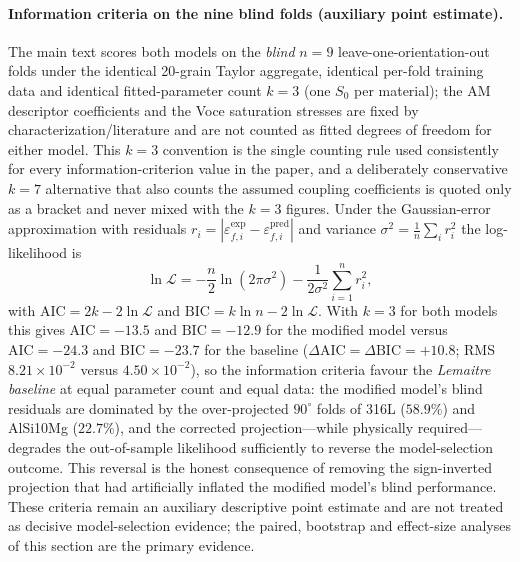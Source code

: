 \documentclass[11pt,a4paper,twocolumn]{article}
\providecommand{\ang}[1]{\ensuremath{#1^{\circ}}}
\begin{document}
\paragraph{Information criteria on the nine blind folds (auxiliary point estimate).}
The main text scores both models on the \emph{blind} $n = 9$ leave-one-orientation-out folds under the identical
20-grain Taylor aggregate, identical per-fold training data and identical fitted-parameter count $k = 3$ (one $S_0$
per material); the AM descriptor coefficients and the Voce saturation stresses are fixed by characterization/literature
and are not counted as fitted degrees of freedom for either model. This $k = 3$ convention is the single counting rule
used consistently for every information-criterion value in the paper, and a deliberately conservative $k = 7$
alternative that also counts the assumed coupling coefficients is quoted only as a bracket and never mixed with the
$k = 3$ figures. Under the Gaussian-error approximation with residuals $r_i = |\varepsilon_{f,i}^{\mathrm{exp}} -
\varepsilon_{f,i}^{\mathrm{pred}}|$ and variance $\sigma^2 = \frac{1}{n}\sum_i r_i^2$ the log-likelihood is
\begin{equation}
\ln \mathcal{L} = -\frac{n}{2}\ln(2\pi\sigma^2) - \frac{1}{2\sigma^2}\sum_{i=1}^{n} r_i^2,
\label{eq:si_loglike}
\end{equation}
with $\mathrm{AIC} = 2k - 2\ln\mathcal{L}$ and $\mathrm{BIC} = k\ln n - 2\ln\mathcal{L}$. With $k = 3$ for both models
this gives $\mathrm{AIC} = -13.5$ and $\mathrm{BIC} = -12.9$ for the modified model versus $\mathrm{AIC} = -24.3$ and
$\mathrm{BIC} = -23.7$ for the baseline ($\Delta\mathrm{AIC} = \Delta\mathrm{BIC} = +10.8$; RMS $8.21\times10^{-2}$ versus
$4.50\times10^{-2}$), so the information criteria favour the \emph{Lemaitre baseline} at equal parameter count and equal
data: the modified model's blind residuals are dominated by the over-projected $\ang{90}$ folds of 316L ($58.9\%$) and
AlSi10Mg ($22.7\%$), and the corrected projection---while physically required---degrades the out-of-sample likelihood
sufficiently to reverse the model-selection outcome. This reversal is the honest consequence of removing the
sign-inverted projection that had artificially inflated the modified model's blind performance. These criteria remain an
auxiliary descriptive point estimate and are not treated as decisive model-selection evidence; the paired,
bootstrap and effect-size analyses of this section are the primary evidence.
\end{document}
